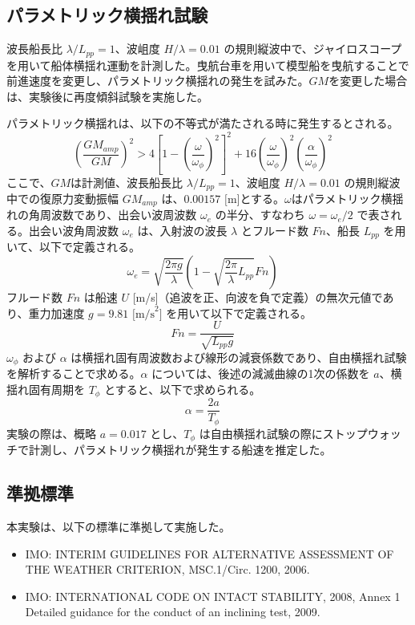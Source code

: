 \documentclass[dvipdfmx,a4paper]{jreport} %
\begin{document}
\subsection{パラメトリック横揺れ試験}
波長船長比 $\lambda/L_{pp}=1$、波岨度 $H/\lambda=0.01$ の規則縦波中で、ジャイロスコープを用いて船体横揺れ運動を計測した。曳航台車を用いて模型船を曳航することで前進速度を変更し、パラメトリック横揺れの発生を試みた。$GM$を変更した場合は、実験後に再度傾斜試験を実施した。

パラメトリック横揺れは、以下の不等式が満たされる時に発生するとされる。
$$ \left(\frac{GM_{amp}}{GM}\right)^2 > 4 \left[1 - \left(\frac{\omega}{\omega_\phi}\right)^2\right]^2 + 16 \left(\frac{\omega}{\omega_\phi}\right)^2 \left(\frac{\alpha}{\omega_\phi}\right)^2 \quad \text{} $$
ここで、$GM$は計測値、波長船長比 $\lambda/L_{pp}=1$、波岨度 $H/\lambda=0.01$ の規則縦波中での復原力変動振幅 $GM_{amp}$ は、$0.00157 \text{ [m]}$とする。$\omega$はパラメトリック横揺れの角周波数であり、出会い波周波数 $\omega_e$ の半分、すなわち $\omega=\omega_e/2$ で表される。出会い波角周波数 $\omega_e$ は、入射波の波長 $\lambda$ とフルード数 $Fn$、船長 $L_{pp}$ を用いて、以下で定義される。
$$ \omega_e = \sqrt{\frac{2\pi g}{\lambda}} \left(1 - \sqrt{\frac{2\pi}{\lambda}L_{pp}} Fn\right) \quad \text{} $$
フルード数 $Fn$ は船速 $U$ [m/s]（追波を正、向波を負で定義）の無次元値であり、重力加速度 $g=9.81 \text{ [m/s}^2\text{]}$ を用いて以下で定義される。
$$ Fn = \frac{U}{\sqrt{L_{pp} g}} \quad \text{} $$
$\omega_\phi$ および $\alpha$ は横揺れ固有周波数および線形の減衰係数であり、自由横揺れ試験を解析することで求める。$\alpha$ については、後述の減滅曲線の1次の係数を $a$、横揺れ固有周期を $T_\phi$ とすると、以下で求められる。
$$ \alpha = \frac{2a}{T_\phi} \quad \text{} $$
実験の際は、概略 $a=0.017$ とし、$T_\phi$ は自由横揺れ試験の際にストップウォッチで計測し、パラメトリック横揺れが発生する船速を推定した。

\subsection{準拠標準}
本実験は、以下の標準に準拠して実施した。
\begin{itemize}
    \item IMO: INTERIM GUIDELINES FOR ALTERNATIVE ASSESSMENT OF THE WEATHER CRITERION, MSC.1/Circ. 1200, 2006.
    \item IMO: INTERNATIONAL CODE ON INTACT STABILITY, 2008, Annex 1 Detailed guidance for the conduct of an inclining test, 2009.
\end{itemize}
\end{document}
